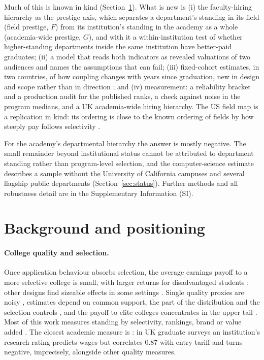 \documentclass[11pt]{article}
\begin{document}
Much of this is known in kind (Section~\ref{sec:background}). What is new is (i) the faculty-hiring hierarchy as
the prestige axis, which separates a department's standing in its field (field prestige, $F$) from its
institution's standing in the academy as a whole (academia-wide prestige, $G$), and with it a within-institution
test of whether higher-standing departments inside the same institution have better-paid graduates; (ii) a model that reads both indicators as revealed valuations of two audiences and names the assumptions
that can fail; (iii) fixed-cohort estimates, in two countries, of how coupling changes with years
since graduation, new in design and scope rather than in direction \citep{thomas2005postbaccalaureate,
macleod2017big}; and (iv) measurement: a reliability bracket and a production audit for the published ranks, a check against
noise in the program medians, and a UK academia-wide hiring hierarchy. The US field map is a replication in kind: its ordering is close to the known ordering of fields
by how steeply pay follows selectivity \citep{bloem2024understanding}.

For the academy's departmental hierarchy the answer is mostly negative. The small remainder beyond institutional
status cannot be attributed to department standing rather than program-level selection, and the computer-science
estimate describes a sample without the University of California campuses and several flagship public departments
(Section~\ref{sec:status}). Further methods and all robustness detail are in the Supplementary Information (SI).

\section{Background and positioning}\label{sec:background}

\paragraph{College quality and selection.} Once application behaviour absorbs selection, the average earnings
payoff to a more selective college is small, with larger returns for disadvantaged students
\citep{dale2002estimating, dale2014estimating}; other designs find sizeable effects in some settings
\citep{hoekstra2009effect, brewer1999does, witteveen2017earnings}. Single quality proxies are noisy \citep{black2006estimating}, estimates depend on common support, the part of
the distribution and the selection controls \citep{black2004robust, andrews2016quantile, cunha2014measuring}, and
the payoff to elite colleges concentrates in the upper tail \citep{zimmerman2019elite, chetty2023diversifying}. Most of this work measures standing by selectivity, rankings,
brand or value added \citep{riehl2019learning, mountjoy2021returns}. The closest academic measure is
\citet{hussain2009university}: in UK graduate surveys an institution's research rating predicts wages but
correlates 0.87 with entry tariff and turns negative, imprecisely, alongside other quality measures.
\end{document}
